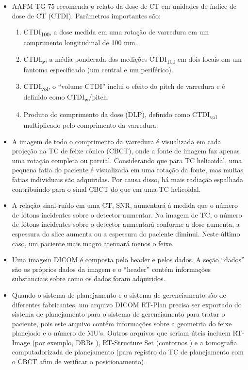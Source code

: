 \documentclass[11pt,a4paper]{article}
\newcounter{exemplo}
\begin{document}
\begin{exemplo}[Imagens]
\begin{itemize}
        \item AAPM TG-75 recomenda o relato da dose de CT em unidades de índice de dose de CT (CTDI). Parâmetros importantes são: 
            \begin{enumerate}[label=\roman*)]
                \item CTDI\textsubscript{100}, a dose medida em uma rotação de varredura em um comprimento longitudinal de 100 mm.
                \item CTDI\textsubscript{w}, a média ponderada das medições CTDI\textsubscript{100} em dois locais em um fantoma especificado (um central e um periférico).
                \item CTDI\textsubscript{vol}, o “volume CTDI” inclui o efeito do pitch de varredura e é definido como CTDI\textsubscript{w}/pitch.
                \item Produto do comprimento da dose (DLP), definido como CTDI\textsubscript{vol} multiplicado pelo comprimento da varredura.
            \end{enumerate}

        \item A imagem de todo o comprimento da varredura é visualizada em cada projeção na TC de feixe cônico (CBCT), onde a fonte de imagem faz apenas uma rotação completa ou parcial. Considerando que para TC helicoidal, uma pequena fatia do paciente é visualizada em uma rotação da fonte, mas muitas fatias individuais são adquiridas. Por causa disso, há mais radiação espalhada contribuindo para o sinal CBCT do que em uma TC helicoidal.

        \item A relação sinal-ruído em uma CT, SNR, aumentará à medida que o número de fótons incidentes sobre o detector aumentar. Na imagem de TC, o número de fótons incidentes sobre o detector aumentará conforme a dose aumenta, a espessura do slice aumenta ou a espessura do paciente diminui. Neste último caso, um paciente mais magro atenuará menos o feixe.
        
        \item Uma imagem DICOM é composta pelo header e pelos dados. A seção “dados” são os próprios dados da imagem e o “header” contém informações substanciais sobre como os dados foram adquiridos.
        
        \item Quando o sistema de planejamento e o sistema de gerenciamento são de diferentes fabricantes, um arquivo DICOM RT-Plan precisa ser exportado do sistema de planejamento para o sistema de gerenciamento para tratar o paciente, pois este arquivo contém informações sobre a geometria do feixe planejado e o número de MU's. Outros arquivos que seriam úteis incluem RT-Image (por exemplo, DRRs ), RT-Structure Set (contornos ) e a tomografia computadorizada de planejamento (para registro da TC de planejamento com o CBCT afim de verificar o posicionamento).
        

\end{itemize}
\end{exemplo}
\end{document}
